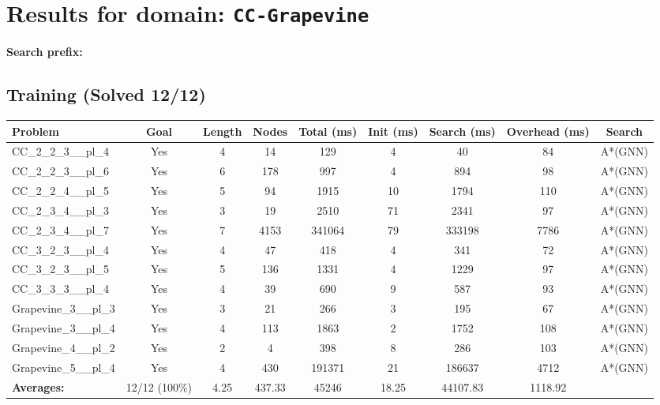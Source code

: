 \documentclass{article}
\begin{document}
\section*{Results for domain: \texttt{CC-Grapevine}}
\textbf{Search prefix:} 
\\[0.5cm]
\subsection*{Training (Solved 12/12)}
\begin{tabular}{lcccccccc}
\toprule
Problem & Goal & Length & Nodes & Total (ms) & Init (ms) & Search (ms) & Overhead (ms) & Search \\
\midrule
CC\_2\_2\_3\_\_pl\_4 & Yes & 4 & 14 & 129 & 4 & 40 & 84 & A*(GNN) \\
CC\_2\_2\_3\_\_pl\_6 & Yes & 6 & 178 & 997 & 4 & 894 & 98 & A*(GNN) \\
CC\_2\_2\_4\_\_pl\_5 & Yes & 5 & 94 & 1915 & 10 & 1794 & 110 & A*(GNN) \\
CC\_2\_3\_4\_\_pl\_3 & Yes & 3 & 19 & 2510 & 71 & 2341 & 97 & A*(GNN) \\
CC\_2\_3\_4\_\_pl\_7 & Yes & 7 & 4153 & 341064 & 79 & 333198 & 7786 & A*(GNN) \\
CC\_3\_2\_3\_\_pl\_4 & Yes & 4 & 47 & 418 & 4 & 341 & 72 & A*(GNN) \\
CC\_3\_2\_3\_\_pl\_5 & Yes & 5 & 136 & 1331 & 4 & 1229 & 97 & A*(GNN) \\
CC\_3\_3\_3\_\_pl\_4 & Yes & 4 & 39 & 690 & 9 & 587 & 93 & A*(GNN) \\
Grapevine\_3\_\_pl\_3 & Yes & 3 & 21 & 266 & 3 & 195 & 67 & A*(GNN) \\
Grapevine\_3\_\_pl\_4 & Yes & 4 & 113 & 1863 & 2 & 1752 & 108 & A*(GNN) \\
Grapevine\_4\_\_pl\_2 & Yes & 2 & 4 & 398 & 8 & 286 & 103 & A*(GNN) \\
Grapevine\_5\_\_pl\_4 & Yes & 4 & 430 & 191371 & 21 & 186637 & 4712 & A*(GNN) \\
\textbf{Averages:} & 12/12 (100\%) & 4.25 & 437.33 & 45246 & 18.25 & 44107.83 & 1118.92 & \\
\bottomrule
\end{tabular}
\\[0.7cm]
\end{document}
